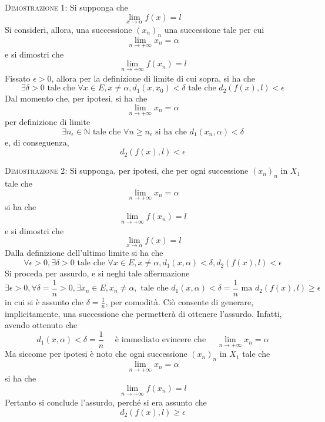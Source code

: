 \documentclass[a4paper]{extarticle}
\begin{document}
\vspace{2em}
\noindent
\normalfont \normalsize
\textsc{Dimostrazione 1}: Si supponga che
\[\lim_{x \to \alpha} f(x) = l\]
Si consideri, allora, una successione $(x_n)_n$ una successione tale per cui
\[\lim_{n \to +\infty} x_n = \alpha\]
e si dimostri che 
\[\lim_{n \to +\infty} f(x_n) = l\]
Fissato $\epsilon>0$, allora per la definizione di limite di cui sopra, si ha che
\[\exists \delta > 0 \text{ tale che } \forall x \in E, x \neq \alpha, d_1(x,x_0) < \delta \text{ tale che } d_2(f(x),l) < \epsilon\]
Dal momento che, per ipotesi, si ha che
\[\lim_{n \to +\infty} x_n = \alpha\]
per definizione di limite
\[\exists n_\epsilon \in \mathbb{N} \text{ tale che } \forall n \geq n_\epsilon \text{ si ha che } d_1(x_n,\alpha) < \delta\]
e, di conseguenza,
\[d_2(f(x),l) < \epsilon\]

\vspace{2em}
\noindent
\normalfont \normalsize
\textsc{Dimostrazione 2}: Si supponga, per ipotesi, che per ogni successione $(x_n)_n$ in $X_1$ tale che
\[\lim_{n \to +\infty} x_n = \alpha\]
si ha che
\[\lim_{n \to +\infty} f(x_n) = l\]
e si dimostri che
\[\lim_{x \to \alpha} f(x) = l\]
Dalla definizione dell'ultimo limite si ha che
\[\forall \epsilon > 0, \exists \delta > 0 \text{ tale che } \forall x \in E, x \neq \alpha, d_1(x,\alpha)<\delta, d_2(f(x),l) < \epsilon\]
Si proceda per assurdo, e si neghi tale affermazione
\[\exists \epsilon > 0, \forall \delta = \frac{1}{n} > 0, \exists x_n \in E, x_n \neq \alpha, \text{ tale che } d_1(x,\alpha)<\delta=\frac{1}{n} \text{ ma } d_2(f(x),l) \geq \epsilon\]
in cui si è assunto che $\delta=\frac{1}{n}$, per comodità. Ciò consente di generare, implicitamente, una successione che permetterà di ottenere l'assurdo. Infatti, avendo ottenuto che
\[d_1(x,\alpha)<\delta=\frac{1}{n} \hspace{1em} \text{ è immediato evincere che } \hspace{1em} \lim_{n \to +\infty} x_n = \alpha\]
Ma siccome per ipotesi è noto che ogni successione $(x_n)_n$ in $X_1$ tale che
\[\lim_{n \to +\infty} x_n = \alpha\]
si ha che
\[\lim_{n \to +\infty} f(x_n) = l\]
Pertanto si conclude l'assurdo, perché si era assunto che 
\[d_2(f(x),l) \geq \epsilon\]
\end{document}
